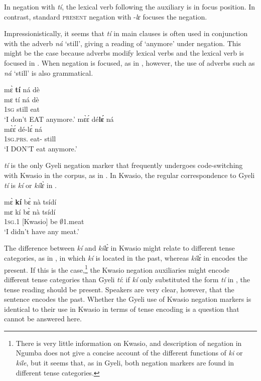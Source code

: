 \noindent In negation with {\itshape tí}, the lexical verb following the auxiliary is in focus position. In contrast, standard \textsc{present} negation with -{\itshape lɛ} focuses the negation.

Impressionistically, it seems that {\itshape tí} in main clauses is often used in conjunction with the adverb {\itshape ná} `still', giving a reading of `anymore' under negation. This might be the case because adverbs modify lexical verbs and the lexical verb is focused in . When negation is focused, as in , however, the use of adverbs such as {\itshape ná} `still' is also grammatical.

\ea\label{tile2}
\ea \label{tile2a}
  \glll  mɛ̀ {\bfseries tí} ná dè \\
         mɛ tí ná dè \\
           1\textsc{sg} {\NEG} still eat\\
    \trans `I don't EAT anymore.'
\ex \label{tile2b}
  \glll  mɛ̀ɛ́ dé{\bfseries lɛ́} ná \\
        mɛ̀ɛ́ dé-lɛ́ ná \\
         1\textsc{sg}.\textsc{prs}.{\NEG} eat-{\NEG} still\\
    \trans `I DON'T eat anymore.'
\z
\z


{\itshape tí} is the only Gyeli negation marker that frequently undergoes code-switching with Kwasio in the corpus, as in . In Kwasio, the regular correspondence to Gyeli {\itshape tí} is {\itshape kí} or {\itshape kílɛ̀} in .

\ea\label{ti5}
  \glll mɛ̀ {\bfseries kí} bɛ̀ nà tsídí \\
       mɛ kí bɛ̀ nà tsídí \\
       1\textsc{sg}.{\PST}1 {\NEG}[Kwasio] be {\COM} $\emptyset$1.meat\\
    \trans `I didn't have any meat.'
\z

\noindent The difference between {\itshape kí} and {\itshape kílɛ̀} in Kwasio might relate to different tense categories, as in , in which {\itshape kí} is located in the past, whereas {\itshape kílɛ̀} in  encodes the present. If this is the case,\footnote{There is very little information on Kwasio, and  description of negation in Ngumba does not give a concise account of the different functions of {\itshape ki} or {\itshape kile}, but it seems that, as in Gyeli, both negation markers are found in different tense categories.} the Kwasio negation auxiliaries might encode different tense categories than Gyeli {\itshape tí}: if {\itshape kí} only substituted the form {\itshape tí} in , the tense reading should be present. Speakers are very clear, however, that the sentence encodes the past. Whether the Gyeli use of Kwasio negation markers is identical to their use in Kwasio in terms of tense encoding is a question that cannot be answered here.

